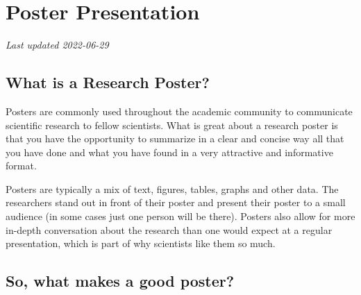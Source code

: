 \documentclass[
]{book}
\begin{document}
\hypertarget{poster-presentation}{%
\chapter*{Poster Presentation}\label{poster-presentation}}

\emph{Last updated 2022-06-29}

\hypertarget{what-is-a-research-poster}{%
\section*{What is a Research Poster?}\label{what-is-a-research-poster}}

Posters are commonly used throughout the academic community to communicate scientific research to fellow scientists. What is great about a research poster is that you have the opportunity to summarize in a clear and concise way all that you have done and what you have found in a very attractive and informative format.

Posters are typically a mix of text, figures, tables, graphs and other data. The researchers stand out in front of their poster and present their poster to a small audience (in some cases just one person will be there). Posters also allow for more in-depth conversation about the research than one would expect at a regular presentation, which is part of why scientists like them so much.

\hypertarget{so-what-makes-a-good-poster}{%
\section*{So, what makes a good poster?}\label{so-what-makes-a-good-poster}}
\end{document}
